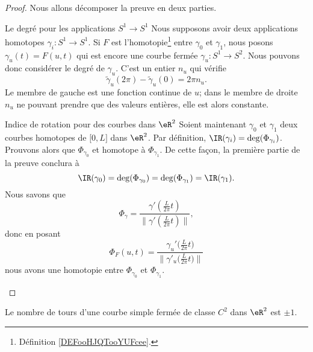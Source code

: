 \begin{proof}
    Nous allons décomposer la preuve en deux parties.
    \begin{subproof}
    \item[Le degré pour les applications \( S^1\to S^1\)]
        Nous supposons avoir deux applications homotopes \( \gamma_i\colon S^1\to S^1\). Si \( F\) est l'homotopie\footnote{Définition \ref{DEFooHJQTooYUFcee}.} entre \( \gamma_0\) et \( \gamma_1\), nous posons \( \gamma_u(t)=F(u,t)\) qui est encore une courbe fermée \( \gamma_u\colon S^1\to S^2\). Nous pouvons donc considérer le degré de \( \gamma_u\). C'est un entier \( n_u\) qui vérifie
        \begin{equation}
            \tilde \gamma_u(2\pi)-\tilde \gamma_u(0)=2\pi n_u.
        \end{equation}
        Le membre de gauche est une fonction continue de \( u\); dans le membre de droite \( n_u\) ne pouvant prendre que des valeurs entières, elle est alors constante.
    \item[Indice de rotation pour des courbes dans $\eR^2$]
        Soient maintenant \( \gamma_0\) et \( \gamma_1\) deux courbes homotopes de \( \mathopen[ 0 , L \mathclose]\) dans \( \eR^2\). Par définition, \( \IR(\gamma_i)=\deg(\Phi_{\gamma_i})\). Prouvons alors que \( \Phi_{\gamma_0}\) et homotope à \( \Phi_{\gamma_1}\). De cette façon, la première partie de la preuve conclura à
        \begin{equation}
            \IR(\gamma_0)=\deg(\Phi_{\gamma_0})=\deg(\Phi_{\gamma_1})=\IR(\gamma_1).
        \end{equation}
        Nous savons que 
        \begin{equation}
            \Phi_{\gamma}=\frac{ \gamma'\left( \frac{ L }{ 2\pi }t \right) }{ \| \gamma'\left( \frac{ L }{ 2\pi }t \right) \| },
        \end{equation}
        donc en posant
        \begin{equation}
            \Phi_F(u,t)=\frac{ \gamma_u'\big( \frac{ L }{ 2\pi }t \big) }{ \| \gamma'_u\big( \frac{ L }{ 2\pi }t \big) \| }
        \end{equation}
        nous avons une homotopie entre \( \Phi_{\gamma_0}\) et \( \Phi_{\gamma_1}\).
    \end{subproof}
\end{proof}

\begin{theorem}      \label{THOooEQWOooBCRMMZ}
    Le nombre de tours d'une courbe simple fermée de classe \(  C^{2}\) dans \( \eR^2\) est \( \pm 1\).
\end{theorem}

